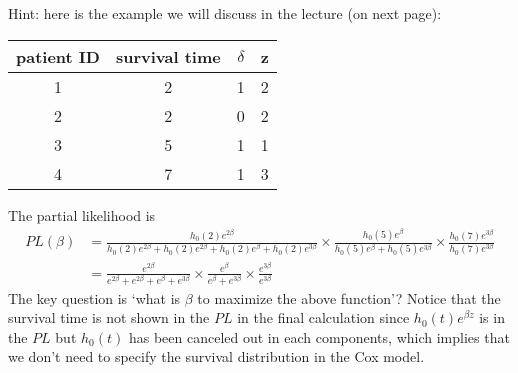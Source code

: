 \parskip 12pt


Hint: here is the example we will discuss in the lecture (on next page):

\begin{center}

\begin{tabular}{|c|c|c|c|}
 \hline
\hline
patient ID & survival time & $\delta$ & z
\\
\hline
1	& 2&1 & 2\\
\hline
2	&2&0 & 2\\
\hline
3	&5&1 & 1\\
\hline
4	& 7&1 & 3\\
\hline
\hline

\end{tabular}
\end{center}

The partial likelihood is
$$
\begin{aligned}
PL(\beta) &= \frac{h_0(2)e^{2\beta}}{h_0(2)e^{2\beta}+h_0(2)e^{2\beta}+h_0(2)e^{\beta} + h_0(2)e^{3\beta}} 
\times  \frac{h_0(5)e^{\beta}}{h_0(5)e^{\beta} +h_0(5)e^{3\beta} } \times \frac{h_0(7)e^{3\beta}}{h_0(7)e^{3\beta}}\\
&=\frac{e^{2\beta}}{e^{2\beta}+e^{2\beta}+e^{\beta} + e^{3\beta}} 
\times  \frac{e^{\beta}}{e^{\beta} +e^{3\beta} } \times \frac{e^{3\beta}}{e^{3\beta}}
\end{aligned}
$$
The key question is `what is $\beta$ to maximize the above function'? Notice that the survival time is not shown in the $PL$ in the final calculation since $h_0(t)e^{\beta z}$ is in the $PL$ but $h_0(t)$ has been canceled out in each components, which implies that we don't need to specify the survival distribution in the Cox model.









